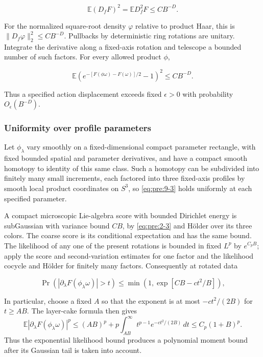 \begin{equation}
\mathbb E(D_fF)^2=\mathbb ED_f^2F\leq CB^{-D}.
\label{eq:pre:9-2}
\end{equation}

For the normalized square-root density \(\varphi\) relative to product Haar, this is \(\|D_f\varphi\|_2^2\leq CB^{-D}\). Pullbacks by deterministic ring rotations are unitary. Integrate the derivative along a fixed-axis rotation and telescope a bounded number of such factors. For every allowed product \(\phi\),

\begin{equation}
\mathbb E\left(e^{-[F(\phi\omega)-F(\omega)]/2}-1\right)^2\leq CB^{-D}.
\label{eq:pre:9-3}
\end{equation}

Thus a specified action displacement exceeds fixed \(\epsilon>0\) with probability \(O_\epsilon(B^{-D})\).

\subsubsection{Uniformity over profile parameters}\label{pre:part-9-1}

Let \(\phi_\lambda\) vary smoothly on a fixed-dimensional compact parameter rectangle, with fixed bounded spatial and parameter derivatives, and have a compact smooth homotopy to identity of this same class. Such a homotopy can be subdivided into finitely many small increments, each factored into three fixed-axis profiles by smooth local product coordinates on \(S^3\), so \eqref{eq:pre:9-3} holds uniformly at each specified parameter.

A compact microscopic Lie-algebra score with bounded Dirichlet energy is subGaussian with variance bound \(CB\), by \eqref{eq:pre:2-3} and H\"older over its three colors. The coarse score is its conditional expectation and has the same bound. The likelihood of any one of the present rotations is bounded in fixed \(L^p\) by \(e^{C_pB}\); apply the score and second-variation estimates for one factor and the likelihood cocycle and H\"older for finitely many factors. Consequently at rotated data

\[
\Pr(|\partial_\lambda F(\phi_\lambda\omega)|>t)
\leq\min(1,\exp[CB-ct^2/B]),
\]

In particular, choose a fixed \(A\) so that the exponent is at most
\(-ct^2/(2B)\) for \(t\geq AB\). The layer-cake formula then gives
\[
 \mathbb E|\partial_\lambda F(\phi_\lambda\omega)|^p
 \leq (AB)^p+p\int_{AB}^{\infty}t^{p-1}e^{-ct^2/(2B)}\,dt
 \leq C_p(1+B)^p.
\]
Thus the exponential likelihood bound produces a polynomial moment bound
after its Gaussian tail is taken into account.

